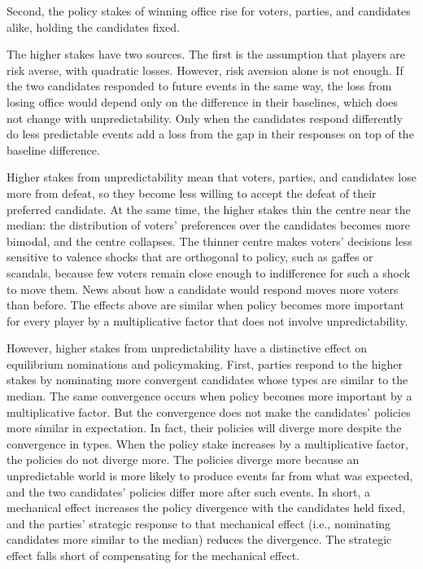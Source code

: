 \documentclass[12pt,letterpaper]{article}
\begin{document}
Second, the policy stakes of winning office rise for voters, parties, and candidates alike, holding the candidates fixed.

The higher stakes have two sources. The first is the assumption that players are risk averse, with quadratic losses. However, risk aversion alone is not enough. If the two candidates responded to future events in the same way, the loss from losing office would depend only on the difference in their baselines, which does not change with unpredictability. Only when the candidates respond differently do less predictable events add a loss from the gap in their responses on top of the baseline difference.

Higher stakes from unpredictability mean that voters, parties, and candidates lose more from defeat, so they become less willing to accept the defeat of their preferred candidate. At the same time, the higher stakes thin the centre near the median: the distribution of voters' preferences over the candidates becomes more bimodal, and the centre collapses. The thinner centre makes voters' decisions less sensitive to valence shocks that are orthogonal to policy, such as gaffes or scandals, because few voters remain close enough to indifference for such a shock to move them. News about how a candidate would respond moves more voters than before. The effects above are similar when policy becomes more important for every player by a multiplicative factor that does not involve unpredictability.

However, higher stakes from unpredictability have a distinctive effect on equilibrium nominations and policymaking. First, parties respond to the higher stakes by nominating more convergent candidates whose types are similar to the median. The same convergence occurs when policy becomes more important by a multiplicative factor. But the convergence does not make the candidates' policies more similar in expectation. In fact, their policies will diverge more despite the convergence in types. When the policy stake increases by a multiplicative factor, the policies do not diverge more. The policies diverge more because an unpredictable world is more likely to produce events far from what was expected, and the two candidates' policies differ more after such events. In short, a mechanical effect increases the policy divergence with the candidates held fixed, and the parties' strategic response to that mechanical effect (i.e., nominating candidates more similar to the median) reduces the divergence. The strategic effect falls short of compensating for the mechanical effect.
\end{document}
